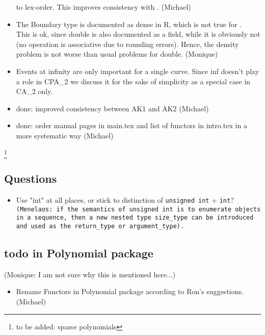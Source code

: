\begin{itemize}
to lex-order. This improves consistency with . 
(Michael)
\item
The Boundary type is documented as dense in R, which is not true
for .\\ 
This is ok, since double is also documented as a
field, while it is obviously not (no operation is associative
due to rounding errors). Hence, the density problem is not worse
than usual problems for double. (Monique)
\item 
Events at infinity are only important for a single curve. Since
inf doesn't play a role in CPA\_2 we discuss it for the sake of
simplicity as a special case in CA\_2 only. 
\item {} done: improved consistency between AK1 and AK2 (Michael)
\item {} done: order manual pages in main.tex and list of functors 
in intro.tex in a more systematic way (Michael)
\end{itemize}
\footnote{to be added: sparse polynomials}

\subsection{Questions}
\begin{itemize}
\item Use "int" at all places, or stick to distinction of \texttt{unsigned
   int} + \texttt{int}?\\
   \texttt{(Menelaos: if the semantics of \texttt{unsigned int} is to enumerate
   objects in a sequence, then a new nested type \texttt{size\_type}
   can be introduced and used as the \texttt{return\_type} or
   \texttt{argument\_type}).}
\end{itemize}

\subsection{todo in Polynomial package} 
(Monique: I am not sure why this is mentioned here...)
\begin{itemize}
\item 
Rename Functors in Polynomial package according to Ron's 
suggestions. (Michael)
\end{itemize} 

